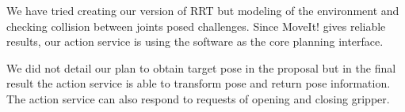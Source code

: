 We have tried creating our version of RRT but modeling of the environment and checking collision between joints posed challenges. Since MoveIt! gives reliable results, our action service is using the software as the core planning interface.

We did not detail our plan to obtain target pose in the proposal but in the final result the action service is able to transform pose and return pose information. The action service can also respond to requests of opening and closing gripper.









